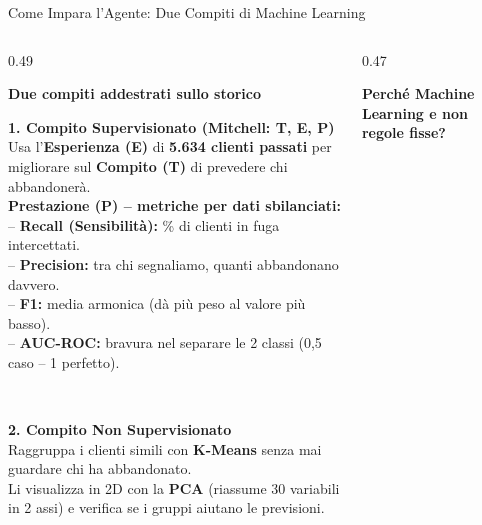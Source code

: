 \documentclass[aspectratio=169, 10pt]{beamer}
\newcommand{\card}[3]{%
    \colorbox{#1}{\parbox{\dimexpr#2-2\fboxsep\relax}{\raggedright #3}}%
}
\begin{document}
\begin{frame}{Come Impara l'Agente: Due Compiti di Machine Learning}
    \begin{columns}[T, onlytextwidth]
        \begin{column}{0.49\textwidth}
            \raggedright
            \textbf{\color{PrimaryNavy} Due compiti addestrati sullo storico}
            \vspace{1.8mm}

            \card{CardBlue}{\linewidth}{\scriptsize
                \textbf{\color{PrimaryNavy}\small 1. Compito Supervisionato (Mitchell: T, E, P)}\\[2pt]
                Usa l'\textbf{Esperienza (E)} di \textbf{5.634 clienti passati} per migliorare sul \textbf{Compito (T)} di prevedere chi abbandonerà.\\[2pt]
                \textbf{Prestazione (P) -- metriche per dati sbilanciati:}\\
                -- \textbf{Recall (Sensibilità):} \% di clienti in fuga intercettati.\\
                -- \textbf{Precision:} tra chi segnaliamo, quanti abbandonano davvero.\\
                -- \textbf{F1:} media armonica (dà più peso al valore più basso).\\
                -- \textbf{AUC-ROC:} bravura nel separare le 2 classi (0,5 caso -- 1 perfetto).
            }\\[2mm]

            \card{CardGreen}{\linewidth}{\scriptsize
                \textbf{\color{AccentGreen}\small 2. Compito Non Supervisionato}\\[2pt]
                Raggruppa i clienti simili con \textbf{K-Means} senza mai guardare chi ha abbandonato.\\[1.5pt]
                Li visualizza in 2D con la \textbf{PCA} (riassume 30 variabili in 2 assi) e verifica se i gruppi aiutano le previsioni.
            }
        \end{column}

        \begin{column}{0.47\textwidth}
            \raggedright
            \textbf{\color{PrimaryNavy} Perché Machine Learning e non regole fisse?}
            \vspace{1.8mm}


\end{column}
\end{columns}
\end{frame}
\end{document}
